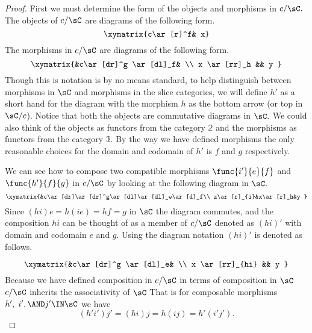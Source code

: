 \documentclass[main.tex]{subfiles}
\begin{document}
\begin{proof}
	First we must determine the form of the objects and morphisms in \(c/\sC.\)
	The objects of \(c/\sC\) are diagrams of the following form.
	\[ \xymatrix{c\ar[r]^f& x} \]
	The morphisms in \(c/\sC\) are diagrams of the following form.
	\[ \xymatrix{&c\ar[dr]^g \ar[dl]_f& \\ x \ar[rr]_h && y } \]
	Though this is notation is by no means standard, to help distinguish between
	morphisms in \(\sC\) and morphisms in the slice categories, we will
	define \(h'\) as a short hand for the diagram with the morphism \(h\) as the
	bottom arrow (or top in \(\sC/c\)). Notice that both the objects are
	commutative diagrams in \(\sC.\) We could also think of the objects as
	functors from  the category \(\mathbb{2}\) and the morphisms as functors
	from the category \(\mathbb{3}.\) By the way we have defined morphisms the
	only reasonable choices for the domain and codomain of \(h'\) is \(f\) and
	\(g\) respectively.

	We can see how to compose two compatible morphisms \(\func{i'}{e}{f}\) and
	\(\func{h'}{f}{g}\) in \(c/\sC\) by looking at the following diagram in
	\(\sC.\)
	\[ \xymatrix{&c\ar[dr]\ar[dr]^g\ar[dl]\ar[dl]_e\ar[d]_f\\
	z\ar[r]_{i}&x\ar[r]_h&y } \]
	Since \((hi)e=h(ie)=hf=g\) in \(\sC\) the diagram commutes, and the
	composition \(hi\) can be thought of as a member of \(c/\sC\) denoted as
	\((hi)'\) with domain and codomain \(e\) and \(g\). Using the diagram
	notation \((hi)'\) is denoted as follows.

	\[ \xymatrix{&c\ar[dr]^g \ar[dl]_e& \\ x \ar[rr]_{hi} && y } \]
	Because we have defined composition in \(c/\sC\) in terms of composition
	in \(\sC\) \(c/\sC\) inherits the associativity of \(\sC\) That
	is for composable morphisms  \(h',\;i',\AND j' \IN \sC\) we have
	\[ (h'i')j'=(hi)j=h(ij)=h'(i'j'). \]


\end{proof}
\end{document}
